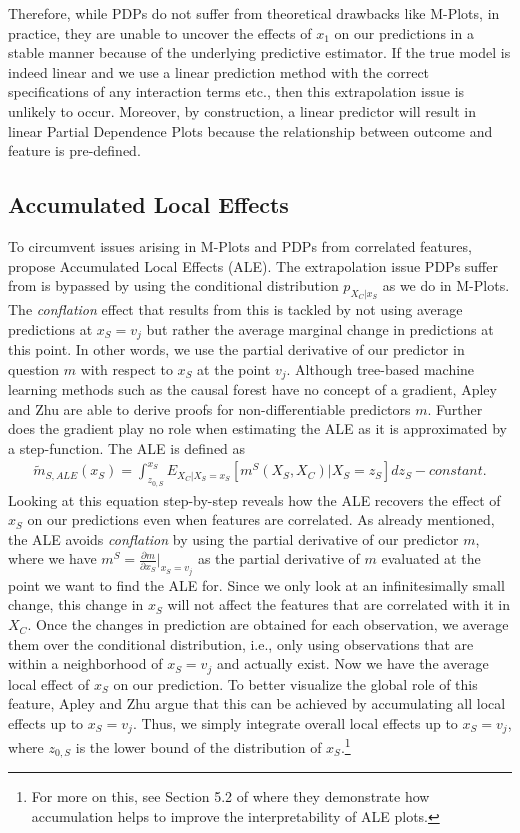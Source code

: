 Therefore, while PDPs do not suffer from theoretical drawbacks like M-Plots, in practice, they are unable to uncover the effects of $x_1$ on our predictions in a stable manner because of the underlying predictive estimator. If the true model is indeed linear and we use a linear prediction method with the correct specifications of any interaction terms etc., then this extrapolation issue is unlikely to occur. Moreover, by construction, a linear predictor will result in linear Partial Dependence Plots because the relationship between outcome and feature is pre-defined.

\subsection{Accumulated Local Effects}
To circumvent issues arising in M-Plots and PDPs from correlated features, \citep{apleyzhu_2020} propose Accumulated Local Effects (ALE). The extrapolation issue PDPs suffer from is bypassed by using the conditional distribution $p_{X_C|x_S}$ as we do in M-Plots. The \textit{conflation} effect that results from this is tackled by not using average predictions at $x_S=v_j$ but rather the average marginal change in predictions at this point. In other words, we use the partial derivative of our predictor in question $m$ with respect to $x_S$ at the point $v_j$. Although tree-based machine learning methods such as the causal forest have no concept of a gradient, Apley and Zhu are able to derive proofs for non-differentiable predictors $m$. Further does the gradient play no role when estimating the ALE as it is approximated by a step-function. The ALE is defined as
\begin{align}
\tilde{m}_{S, ALE} (x_S)=\int_{z_{0, S}}^{x_S} E_{X_C|X_S=x_S}[m^S(X_S, X_C)|X_S=z_S]dz_S - constant. \label{eq:ale}
\end{align}
Looking at this equation step-by-step reveals how the ALE recovers the effect of $x_S$ on our predictions even when features are correlated. As already mentioned, the ALE avoids \textit{conflation} by using the partial derivative of our predictor $m$, where we have $m^S=\frac{\partial m}{\partial x_S}\rvert_{x_S=v_j}$ as the partial derivative of $m$ evaluated at the point we want to find the ALE for. Since we only look at an infinitesimally small change, this change in $x_S$ will not affect the features that are correlated with it in $X_C$. Once the changes in prediction are obtained for each observation, we average them over the conditional distribution, i.e., only using observations that are within a neighborhood of $x_S=v_j$ and actually exist. Now we have the average local effect of $x_S$ on our prediction. To better visualize the global role of this feature, Apley and Zhu argue that this can be achieved by accumulating all local effects up to $x_S=v_j$. Thus, we simply integrate overall local effects up to $x_S=v_j$, where $z_{0, S}$ is the lower bound of the distribution of $x_S$.\footnote{For more on this, see Section 5.2 of \citep{apleyzhu_2020} where they demonstrate how accumulation helps to improve the interpretability of ALE plots.} \\
